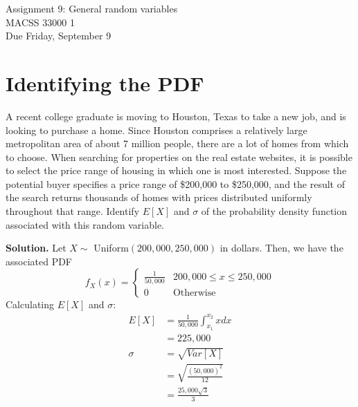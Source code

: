 \documentclass[12pt]{article}
\begin{document}
	\begin{center}
		Assignment 9: General random variables\\
        MACSS 33000 1 \\
		Due Friday, September 9 \\
	\end{center}

\section{Identifying the PDF}

A recent college graduate is moving to Houston, Texas to take a new job, and is looking to purchase a home. Since Houston comprises a relatively large metropolitan area of about 7 million people, there are a lot of homes from which to choose. When searching for properties on the real estate websites, it is possible to select the price range of housing in which one is most interested. Suppose the potential buyer specifies a price range of 
\$200,000 to \$250,000, and the result of the search returns thousands of homes with prices distributed uniformly throughout that range. Identify $E[X]$ and $\sigma$ of the probability density function associated with this random variable.

\textbf{Solution.}
Let $X \sim $ Uniform$(200,000,250,000)$ in dollars. Then, we have the associated PDF
\[ f_X(x) = \begin{cases}
    \frac{1}{50,000} & 200,000 \leq x \leq 250,000
    \\ 0 & \text{Otherwise}
\end{cases}\]
Calculating $E[X]$ and $\sigma$: 
\begin{align*}
    E[X] &= \frac{1}{50,000} \int_{x_1}^{x_2} x dx \\ &= 225,000
    \\ \sigma &= \sqrt{Var[X]} 
    \\ &= \sqrt{\frac{(50,000)^2}{12}}
    \\ &= \frac{25,000\sqrt{3}}{3}
\end{align*}
\end{document}
